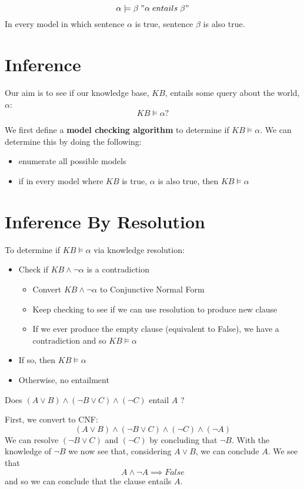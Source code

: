 \begin{definition}[Enatilment]
	\[
		\alpha \models \beta \; "\alpha \; entails \; \beta"
	\]
	In every model in which sentence \(\alpha \) is true, sentence \(\beta \) is also true.
\end{definition}

\section{Inference}
Our aim is to see if our knowledge base, \(KB\), entails some query about the world, \(\alpha\):
\[
	KB \models \alpha ?
\]  

We first define a \textbf{model checking algorithm} to determine if \(KB \models \alpha \). We can determine this by doing the following:
\begin{itemize}
	\item enumerate all possible models
	\item if in every model where \(KB\) is true, \(\alpha \) is also true, then \(KB \models \alpha \) 
\end{itemize}

\section{Inference By Resolution}
To determine if \(KB \models \alpha \) via knowledge resolution:
\begin{itemize}
	\item Check if \(KB \land \neg \alpha \) is a contradiction
	\begin{itemize}
		\item Convert \(KB \land \neg \alpha \) to Conjunctive Normal Form
		\item Keep checking to see if we can use resolution to produce new clause
		\item If we ever produce the empty clause (equivalent to False), we have a contradiction and so \(KB \models \alpha \)
	\end{itemize}
	\item If so, then \(KB \models \alpha \)
	\item Otherwise, no entailment
\end{itemize}

\begin{problem}
	Does \((A \vee B) \land (\neg B \vee C) \land (\neg C)\) entail \(A\) ?
\end{problem}
\begin{answer}
	First, we convert to CNF:
	\[
		(A \vee B) \land (\neg B \vee C) \land (\neg C) \land (\neg A)
	\]
	We can resolve \((\neg B \vee C)\) and \((\neg C)\) by concluding that \(\neg B\). With the knowledge of \(\neg B\) we now see that, considering \(A \vee B\), we can conclude \(A\). We see that
	\[
		A \land \neg A \implies False
	\]
	and so we can conclude that the clause entails \(A\).
\end{answer} 